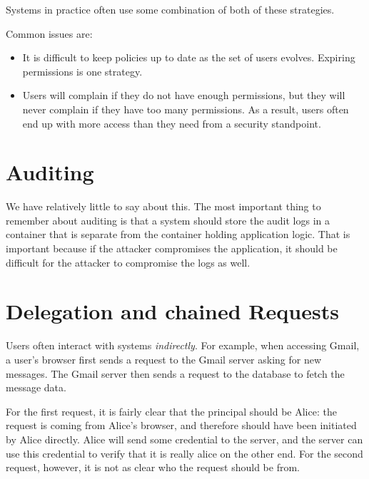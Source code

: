 Systems in practice often use some combination of both of these strategies.

Common issues are:
\begin{itemize}
  \item It is difficult to keep policies up to date as the set of users evolves.
        Expiring permissions is one strategy.
  \item Users will complain if they do not have enough permissions, but they will
        never complain if they have too many permissions. As a result, users
        often end up with more access than they need from a security standpoint.
\end{itemize}


\section{Auditing}

We have relatively little to say about this.
The most important thing to remember about auditing is
that a system should store the audit logs in a container
that is separate from the container holding application logic.
That is important because if the attacker compromises
the application, it should be difficult for the attacker
to compromise the logs as well.


\section{Delegation and chained Requests}
Users often interact with systems \emph{indirectly}.
For example, when accessing Gmail, a user's browser first sends a request to the Gmail server asking for new messages. The Gmail server then sends a request to the database to fetch the message data.

For the first request, it is fairly clear that the principal should be Alice: the request is coming from Alice's browser, and therefore should have been initiated by Alice directly. Alice will send some credential to the server, and the server can use this credential to verify that it is really alice on the other end. For the second request, however, it is not as clear who the request should be from.

